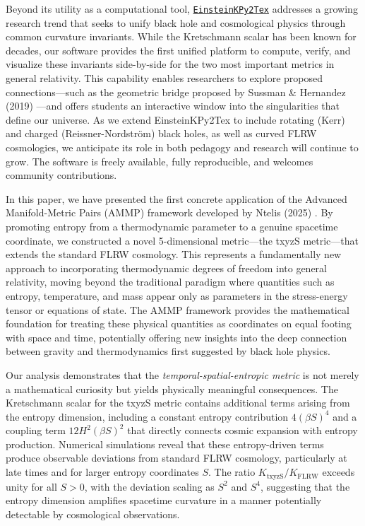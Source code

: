 \documentclass[11pt,a4paper]{article}
\begin{document}
Beyond its utility as a computational tool, \href{https://github.com/lontelis/Einsteinpy_to_latex}{{\color{cyan}\texttt{EinsteinKPy2Tex}}} 
addresses a 
growing research trend that seeks to unify black hole and cosmological 
physics through common curvature invariants. While the Kretschmann scalar 
has been known for decades, our software provides the first unified 
platform to compute, verify, and visualize these invariants side-by-side 
for the two most important metrics in general relativity. This capability 
enables researchers to explore proposed connections---such as the 
geometric bridge proposed by Sussman \& Hernandez (2019) \cite{Sussman2019}---and offers 
students an interactive window into the singularities that define our 
universe. As we extend EinsteinKPy2Tex to include rotating (Kerr) and 
charged (Reissner-Nordstr\"om) black holes, as well as curved FLRW 
cosmologies, we anticipate its role in both pedagogy and research will 
continue to grow. The software is freely available, fully reproducible, 
and welcomes community contributions.

In this paper, we have presented the first concrete application of the 
Advanced Manifold-Metric Pairs (AMMP) framework developed by Ntelis (2025) \cite{Ntelis2025_AMMP}. 
By promoting entropy from a thermodynamic parameter to a genuine spacetime 
coordinate, we constructed a novel 5-dimensional metric—the txyzS metric—that 
extends the standard FLRW cosmology. This represents a fundamentally new 
approach to incorporating thermodynamic degrees of freedom into general 
relativity, moving beyond the traditional paradigm where quantities such 
as entropy, temperature, and mass appear only as parameters in the 
stress-energy tensor or equations of state. The AMMP framework provides 
the mathematical foundation for treating these physical quantities as 
coordinates on equal footing with space and time, potentially offering 
new insights into the deep connection between gravity and thermodynamics 
first suggested by black hole physics.

Our analysis demonstrates that the \textit{temporal-spatial-entropic metric} is not merely 
a mathematical curiosity but yields physically meaningful consequences. 
The Kretschmann scalar for the txyzS metric contains additional terms 
arising from the entropy dimension, including a constant entropy contribution 
$4(\beta S)^4$ and a coupling term $12H^2(\beta S)^2$ that directly 
connects cosmic expansion with entropy production. Numerical simulations 
reveal that these entropy-driven terms produce observable deviations from 
standard FLRW cosmology, particularly at late times and for larger entropy 
coordinates $S$. The ratio $K_{\text{txyzS}}/K_{\text{FLRW}}$ exceeds unity 
for all $S > 0$, with the deviation scaling as $S^2$ and $S^4$, suggesting 
that the entropy dimension amplifies spacetime curvature in a manner 
potentially detectable by cosmological observations.
\end{document}

